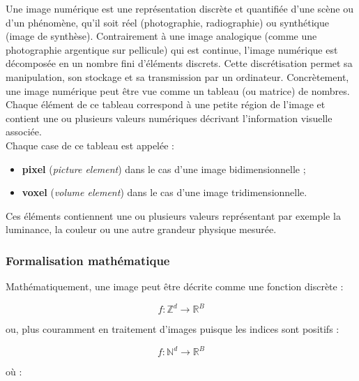 Une image numérique est une représentation discrète et quantifiée d'une scène ou d'un phénomène, qu'il soit réel (photographie, radiographie) ou synthétique (image de synthèse). Contrairement à une image analogique (comme une photographie argentique sur pellicule) qui est continue, l'image numérique est décomposée en un nombre fini d'éléments discrets. Cette discrétisation permet sa manipulation, son stockage et sa transmission par un ordinateur.
Concrètement, une image numérique peut être vue comme un tableau (ou matrice) de nombres. Chaque élément de ce tableau correspond à une petite région de l'image et contient une ou plusieurs valeurs numériques décrivant l'information visuelle associée.\\
Chaque case de ce tableau est appelée :
\begin{itemize}
\item[-] \textbf{pixel} (\textit{picture element}) dans le cas d'une image bidimensionnelle ;
\item[-] \textbf{voxel} (\textit{volume element}) dans le cas d'une image tridimensionnelle.
\end{itemize}

Ces éléments contiennent une ou plusieurs valeurs représentant par exemple la luminance, la couleur ou une autre grandeur physique mesurée.

\subsubsection{Formalisation mathématique}

Mathématiquement, une image peut être décrite comme une fonction discrète :

\[
f : \mathbb{Z}^d \to \mathbb{R}^B
\]

ou, plus couramment en traitement d'images puisque les indices sont positifs :

\[
f : \mathbb{N}^d \to \mathbb{R}^B
\]

où :

